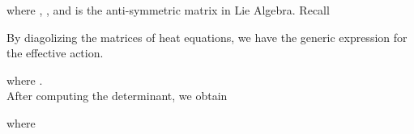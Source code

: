 \documentclass[a4paper,12 pt]{article}
\begin{document}
\begin{center}
\coordHE{}
\end{center}
\begin{center}
 \coordHE{}
\end{center}
where \coordHE{}, \coordHE{},
and \coordHE{} is the anti-symmetric matrix in Lie Algebra. Recall
\begin{center}
 \coordHE{}
\end{center}
By diagolizing the matrices of heat equations, we have the generic
expression for the effective action.
\begin{center}
\coordHE{}
\end{center}
where \coordHE{}.\\
 After computing the determinant, we obtain
\begin{center}
\coordHE{}
\end{center}
where \coordHE{}
\begin{center}
\coordHE{}
\end{center}
\end{document}
